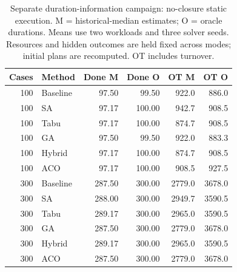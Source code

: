 \begin{table}[H]
\centering\small
\caption{Separate duration-information campaign: no-closure static execution. M = historical-median estimates; O = oracle durations. Means use two workloads and three solver seeds. Resources and hidden outcomes are held fixed across modes; initial plans are recomputed. OT includes turnover.}
\label{tab:room-duration}
\begin{tabular}{@{}rlrrrr@{}}
\toprule
Cases & Method & Done M & Done O & OT M & OT O \\
\midrule
100 & Baseline & 97.50 & 99.50 & 922.0 & 886.0 \\
100 & SA & 97.17 & 100.00 & 942.7 & 908.5 \\
100 & Tabu & 97.17 & 100.00 & 874.7 & 908.5 \\
100 & GA & 97.50 & 99.50 & 922.0 & 883.3 \\
100 & Hybrid & 97.17 & 100.00 & 874.7 & 908.5 \\
100 & ACO & 97.17 & 100.00 & 908.5 & 927.5 \\
300 & Baseline & 287.50 & 300.00 & 2779.0 & 3678.0 \\
300 & SA & 288.00 & 300.00 & 2949.7 & 3590.5 \\
300 & Tabu & 289.17 & 300.00 & 2965.0 & 3590.5 \\
300 & GA & 287.50 & 300.00 & 2779.0 & 3678.0 \\
300 & Hybrid & 289.17 & 300.00 & 2965.0 & 3590.5 \\
300 & ACO & 287.50 & 300.00 & 2779.0 & 3678.0 \\
\bottomrule
\end{tabular}
\end{table}
